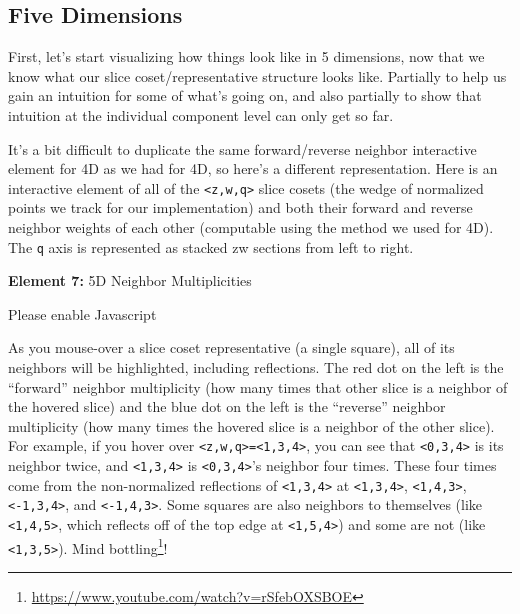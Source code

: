 \documentclass[]{article}
\renewcommand{\href}[2]{#2\footnote{\url{#1}}}
\begin{document}
\hypertarget{five-dimensions}{%
\subsection{Five Dimensions}\label{five-dimensions}}

First, let's start visualizing how things look like in 5 dimensions, now that we
know what our slice coset/representative structure looks like. Partially to help
us gain an intuition for some of what's going on, and also partially to show
that intuition at the individual component level can only get so far.

It's a bit difficult to duplicate the same forward/reverse neighbor interactive
element for 4D as we had for 4D, so here's a different representation. Here is
an interactive element of all of the \texttt{\textless{}z,w,q\textgreater{}}
slice cosets (the wedge of normalized points we track for our implementation)
and both their forward and reverse neighbor weights of each other (computable
using the method we used for 4D). The \texttt{q} axis is represented as stacked
zw sections from left to right.

\leavevmode\hypertarget{golSyms5D}{}%
\textbf{Element 7:} 5D Neighbor Multiplicities

\leavevmode\hypertarget{golSyms5DCont}{}%
Please enable Javascript

As you mouse-over a slice coset representative (a single square), all of its
neighbors will be highlighted, including reflections. The red dot on the left is
the ``forward'' neighbor multiplicity (how many times that other slice is a
neighbor of the hovered slice) and the blue dot on the left is the ``reverse''
neighbor multiplicity (how many times the hovered slice is a neighbor of the
other slice). For example, if you hover over
\texttt{\textless{}z,w,q\textgreater{}=\textless{}1,3,4\textgreater{}}, you can
see that \texttt{\textless{}0,3,4\textgreater{}} is its neighbor twice, and
\texttt{\textless{}1,3,4\textgreater{}} is
\texttt{\textless{}0,3,4\textgreater{}}'s neighbor four times. These four times
come from the non-normalized reflections of
\texttt{\textless{}1,3,4\textgreater{}} at
\texttt{\textless{}1,3,4\textgreater{}},
\texttt{\textless{}1,4,3\textgreater{}},
\texttt{\textless{}-1,3,4\textgreater{}}, and
\texttt{\textless{}-1,4,3\textgreater{}}. Some squares are also neighbors to
themselves (like \texttt{\textless{}1,4,5\textgreater{}}, which reflects off of
the top edge at \texttt{\textless{}1,5,4\textgreater{}}) and some are not (like
\texttt{\textless{}1,3,5\textgreater{}}).
\href{https://www.youtube.com/watch?v=rSfebOXSBOE}{Mind bottling}!
\end{document}
